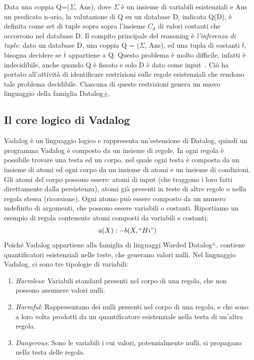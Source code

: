 Data una coppia Q=($\Sigma$, Ans), dove $\Sigma$ è un insieme di variabili esistenziali e Ans un predicato n-ario, la valutazione di Q su un database D, indicata Q(D), è definita come set di tuple sopra sopra l'insieme $C_{d}$ di valori costanti che occorrono nel database D. \newline
Il compito principale del reasoning è \emph{l'inferenza di tuple}: dato un database D, una coppia Q = ($\Sigma$, Ans), ed una tupla di costanti $\bar{t}$, bisogna decidere se $\bar{t}$ appartiene a Q. Questo problema è molto difficile, infatti è indecidibile, anche quando Q è fissato e solo D è dato come input~\cite{cali2013taming}. \newline
Ciò ha portato all'attività di identificare restrizioni sulle regole esistenziali che rendono tale problema decidibile. Ciascuna di queste restrizioni genera un nuovo linguaggio della famiglia Datalog$\pm$. \newline

\subsection{Il core logico di Vadalog}

Vadalog è un linguaggio logico e rappresenta un'estensione di Datalog, quindi un programma Vadalog è composto da un insieme di regole. \newline
In ogni regola è possibile trovare una testa ed un corpo, nel quale ogni testa è composta da un insieme di atomi ed ogni corpo da un insieme di atomi e un insieme di condizioni. Gli atomi del corpo possono essere: atomi di input (che traggono i loro fatti direttamente dalla persistenza), atomi già presenti in teste di altre regole o nella regola stessa (ricorsione). \newline 
Ogni atomo può essere composto da un numero indefinito di argomenti, che possono essere variabili o costanti. \newline
Riportiamo un esempio di regola contenente atomi composti da variabili e costanti: \[a(X) :- b(X,``Hi")\]
Poiché Vadalog appartiene alla famiglia di linguaggi Warded Datalog$^\pm$, contiene quantificatori esistenziali nelle teste, che generano valori nulli. \newline
Nel linguaggio Vadalog, ci sono tre tipologie di variabili:

\begin{enumerate}
	\item \emph{Harmless}: Variabili standard presenti nel corpo di una regola, che non possono assumere valori nulli.
	\item \emph{Harmful}: Rappresentano dei nulli presenti nel corpo di una regola, e che sono a loro volta prodotti da un quantificatore esistenziale nella testa di un'altra regola.
	\item \emph{Dangerous}: Sono le variabili i cui valori, potenzialmente nulli, si propagano nella testa delle regola.
\end{enumerate}

